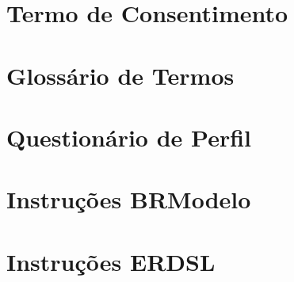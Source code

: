 \begin{apendicesenv}
\section{Termo de Consentimento}
    \begin{figure}
        \centering
         
    \end{figure}
\newpage
\section{Glossário de Termos}
    \begin{figure}
        \centering
         
    \end{figure}
\newpage
\section{Questionário de Perfil}
    \begin{figure}
        \centering
         
    \end{figure}
\newpage
\section{Instruções BRModelo}
    \begin{figure}
        \centering
         
    \end{figure}
\newpage
\section{Instruções ERDSL}
    \begin{figure}
        \centering
         
    \end{figure}
\newpage

\end{apendicesenv}
